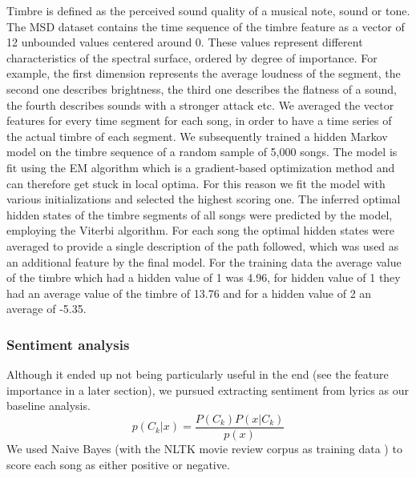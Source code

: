 \documentclass[acmtog]{acmart}
\begin{document}
Timbre is defined as the perceived sound quality of a musical note, sound or tone. The MSD dataset contains the time sequence of the timbre feature as a vector of 12 unbounded values centered around 0. These values represent different characteristics of the spectral
surface, ordered by degree of importance. For example, the first dimension represents the average
loudness of the segment, the second one describes brightness, the third one describes the flatness of a sound, the fourth describes sounds with a stronger attack etc. We averaged the vector features for every time segment for each song, in order to have a time series of the actual timbre of each segment.
We subsequently trained a hidden Markov model on the timbre sequence of a random sample of 5,000 songs. The model is fit using the EM algorithm which is a gradient-based optimization method and can therefore get stuck in local optima. For this reason we fit the model with various initializations and selected the highest scoring one.
The inferred optimal hidden states of the timbre segments of all songs were predicted by the model, employing the Viterbi algorithm.
For each song the optimal hidden states were averaged to provide a single description of the path followed, which was used as an additional feature by the final model.
For the training data the average value of the timbre which had a hidden value of 1 was 4.96, for hidden value of 1 they had an average value of the timbre of 13.76 and for a hidden value of 2 an average of -5.35.

\subsubsection{Sentiment analysis}

Although it ended up not being particularly useful in the end (see the feature importance in a later section), we pursued extracting sentiment from lyrics as our baseline analysis.
\[
  p(C_k | x) = \frac{P(C_k)P(x | C_k)}{p(x)}
\]
We used Naive Bayes (with the NLTK movie review corpus as training data \cite{nltk}) to score each song as either positive or negative.


\end{document}
